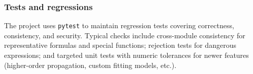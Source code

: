 \documentclass[a4paper,11pt]{article}
\begin{document}
\subsubsection{Tests and regressions}
The project uses \texttt{pytest} to maintain regression tests covering correctness, consistency, and security. Typical checks include cross-module consistency for representative formulas and special functions; rejection tests for dangerous expressions; and targeted unit tests with numeric tolerances for newer features (higher-order propagation, custom fitting models, etc.).
\end{document}
